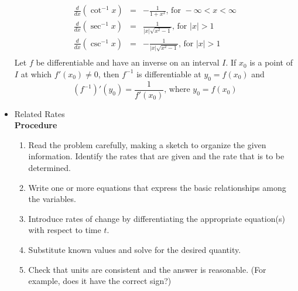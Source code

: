 \documentclass{article}
\begin{document}
\begin{itemize}
\begin{eqnarray}
        \frac{d}{dx}\left(\cot^{-1}{x}\right) &=& -\frac{1}{1 + x^2} \text{, for } -\infty < x < \infty \\
        \frac{d}{dx}\left(\sec^{-1}{x}\right) &=& \frac{1}{|x|\sqrt{x^2 - 1}} \text{, for } |x| > 1 \\
        \frac{d}{dx}\left(\csc^{-1}{x}\right) &=& -\frac{1}{|x|\sqrt{x^2 - 1}} \text{, for } |x| > 1 \\
    \end{eqnarray}
    Let $f$ be differentiable and have an inverse on an interval $I$. If $x_0$ is a point of $I$ at which $f'(x_0) \neq 0$, then $f^{-1}$ is differentiable at $y_0 = f(x_0)$ and
    $$\left(f^{-1}\right)'\left(y_0\right) = \frac{1}{f'\left(x_0\right)} \text{, where } y_0 = f\left(x_0\right)$$
    \item Related Rates
    \\ \textbf{Procedure}
    \begin{enumerate}
        \item Read the problem carefully, making a sketch to organize the given information. Identify the rates that are given and the rate that is to be determined.
        \item Write one or more equations that express the basic relationships among the variables.
        \item Introduce rates of change by differentiating the appropriate equation(s) with respect to time $t$.
        \item Substitute known values and solve for the desired quantity.
        \item Check that units are consistent and the answer is reasonable. (For example, does it have the correct sign?)
    \end{enumerate}
\end{itemize}
\end{document}
